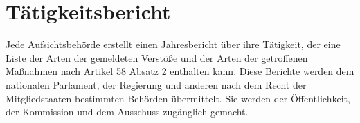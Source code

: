 \chapter{Tätigkeitsbericht}
\label{ch:59}


Jede Aufsichtsbehörde erstellt einen Jahresbericht über ihre Tätigkeit, der eine Liste der Arten der gemeldeten Verstöße
und der Arten der getroffenen Maßnahmen nach \hyperref[itm:58-2]{Artikel 58 Absatz 2} enthalten kann. Diese Berichte
werden dem nationalen Parlament, der Regierung und anderen nach dem Recht der Mitgliedstaaten bestimmten Behörden
übermittelt. Sie werden der Öffentlichkeit, der Kommission und dem Ausschuss zugänglich gemacht.


